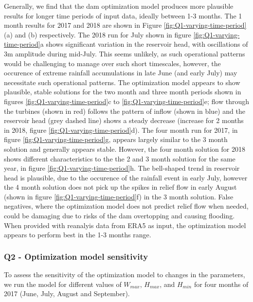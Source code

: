 \documentclass[11pt]{article}
\begin{document}
Generally, we find that the dam optimization model produces more plausible results for longer time periods of input data, ideally between 1-3 months. The 1 month results for 2017 and 2018 are shown in Figure \ref{fig:Q1-varying-time-period} (a) and (b) respectively. The 2018 run for July shown in figure \ref*{fig:Q1-varying-time-period}a shows significant variation in the reservoir head, with oscillations of 3m amplitude during mid-July. This seems unlikely, as such operational patterns would be challenging to manage over such short timescales, however, the occurence of extreme rainfall accumulations in late June (and early July) may necessitate such operational patterns. The optimization model appears to show plausible, stable solutions for the two month and three month periods shown in figures \ref*{fig:Q1-varying-time-period}c to \ref*{fig:Q1-varying-time-period}e; flow through the turbines (shown in red) follows the pattern of inflow (shown in blue) and the reservoir head (grey dashed line) shows a steady decrease (increase for 2 months in 2018, figure \ref*{fig:Q1-varying-time-period}d). The four month run for 2017, in figure \ref*{fig:Q1-varying-time-period}g, appears largely similar to the 3 month solution and generally appears stable. However, the four month solution for 2018 shows different characteristics to the the 2 and 3 month solution for the same year, in figure \ref*{fig:Q1-varying-time-period}h. The bell-shaped trend in reservoir head is plausible, due to the occurence of the rainfall event in early July, however the 4 month solution does not pick up the spikes in relief flow in early August (shown in figure \ref*{fig:Q1-varying-time-period}f) in the 3 month solution. False negatives, where the optimization model does not predict relief flow when needed, could be damaging due to risks of the dam overtopping and causing flooding. When provided with reanalyis data from ERA5 as input, the optimization model appears to perform best in the 1-3 months range.\\

\subsubsection*{Q2 - Optimization model sensitivity}

To assess the sensitivity of the optimization model to changes in the parameters, we run the model for different values of $W_{max}$, $H_{max}$, and $H_{min}$ for four months of 2017 (June, July, August and September).\\
\end{document}
